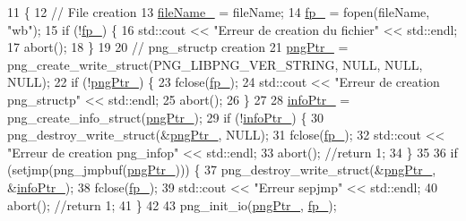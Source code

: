 \begin{DoxyCode}
11                                                   \{
12     \textcolor{comment}{// File creation}
13     \mbox{\hyperlink{class_image_a1f1849b27396edcc169e7d717ef0e6ab}{fileName\_}} = fileName;
14     \mbox{\hyperlink{class_image_a4d43b19efb469f7c9fb65e7202d7ba7f}{fp\_}} = fopen(fileName, \textcolor{stringliteral}{"wb"}); 
15     \textcolor{keywordflow}{if} (!\mbox{\hyperlink{class_image_a4d43b19efb469f7c9fb65e7202d7ba7f}{fp\_}}) \{
16         std::cout << \textcolor{stringliteral}{"Erreur de creation du fichier"} << std::endl;
17         abort();
18     \}
19 
20     \textcolor{comment}{// png\_structp creation}
21     \mbox{\hyperlink{class_image_aaf607d2596bac09b13370599d9ba6d8c}{pngPtr\_}} = png\_create\_write\_struct(PNG\_LIBPNG\_VER\_STRING, NULL, NULL, NULL);
22     \textcolor{keywordflow}{if} (!\mbox{\hyperlink{class_image_aaf607d2596bac09b13370599d9ba6d8c}{pngPtr\_}}) \{
23         fclose(\mbox{\hyperlink{class_image_a4d43b19efb469f7c9fb65e7202d7ba7f}{fp\_}});
24         std::cout << \textcolor{stringliteral}{"Erreur de creation png\_structp"} << std::endl;
25         abort();
26     \}
27 
28     \mbox{\hyperlink{class_image_a505878e5e19500e3cc1b940067faa584}{infoPtr\_}} = png\_create\_info\_struct(\mbox{\hyperlink{class_image_aaf607d2596bac09b13370599d9ba6d8c}{pngPtr\_}}); 
29     \textcolor{keywordflow}{if} (!\mbox{\hyperlink{class_image_a505878e5e19500e3cc1b940067faa584}{infoPtr\_}}) \{
30         png\_destroy\_write\_struct(\&\mbox{\hyperlink{class_image_aaf607d2596bac09b13370599d9ba6d8c}{pngPtr\_}}, NULL);
31         fclose(\mbox{\hyperlink{class_image_a4d43b19efb469f7c9fb65e7202d7ba7f}{fp\_}});
32         std::cout << \textcolor{stringliteral}{"Erreur de creation png\_infop"} << std::endl;
33         abort(); \textcolor{comment}{//return 1; }
34     \}
35 
36     \textcolor{keywordflow}{if} (setjmp(png\_jmpbuf(\mbox{\hyperlink{class_image_aaf607d2596bac09b13370599d9ba6d8c}{pngPtr\_}}))) \{
37         png\_destroy\_write\_struct(\&\mbox{\hyperlink{class_image_aaf607d2596bac09b13370599d9ba6d8c}{pngPtr\_}}, \&\mbox{\hyperlink{class_image_a505878e5e19500e3cc1b940067faa584}{infoPtr\_}}); 
38         fclose(\mbox{\hyperlink{class_image_a4d43b19efb469f7c9fb65e7202d7ba7f}{fp\_}});
39         std::cout << \textcolor{stringliteral}{"Erreur sepjmp"} << std::endl;
40         abort(); \textcolor{comment}{//return 1; }
41     \}
42 
43     png\_init\_io(\mbox{\hyperlink{class_image_aaf607d2596bac09b13370599d9ba6d8c}{pngPtr\_}}, \mbox{\hyperlink{class_image_a4d43b19efb469f7c9fb65e7202d7ba7f}{fp\_}});

\end{DoxyCode}
